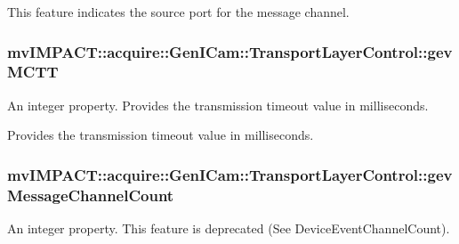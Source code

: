 This feature indicates the source port for the message channel. \hypertarget{classmv_i_m_p_a_c_t_1_1acquire_1_1_gen_i_cam_1_1_transport_layer_control_a00fccdaf940620bc809d5373b899022d}{
\subsubsection[{gev\+M\+C\+T\+T}]{ mv\+I\+M\+P\+A\+C\+T\+::acquire\+::\+Gen\+I\+Cam\+::\+Transport\+Layer\+Control\+::gev\+M\+C\+T\+T}}\label{classmv_i_m_p_a_c_t_1_1acquire_1_1_gen_i_cam_1_1_transport_layer_control_a00fccdaf940620bc809d5373b899022d}


An integer property. Provides the transmission timeout value in milliseconds. 

Provides the transmission timeout value in milliseconds. \hypertarget{classmv_i_m_p_a_c_t_1_1acquire_1_1_gen_i_cam_1_1_transport_layer_control_af689a7e45d74fa1d376432ab51f8784a}{
\subsubsection[{gev\+Message\+Channel\+Count}]{ mv\+I\+M\+P\+A\+C\+T\+::acquire\+::\+Gen\+I\+Cam\+::\+Transport\+Layer\+Control\+::gev\+Message\+Channel\+Count}}\label{classmv_i_m_p_a_c_t_1_1acquire_1_1_gen_i_cam_1_1_transport_layer_control_af689a7e45d74fa1d376432ab51f8784a}


An integer property. This feature is deprecated (See Device\+Event\+Channel\+Count). 

